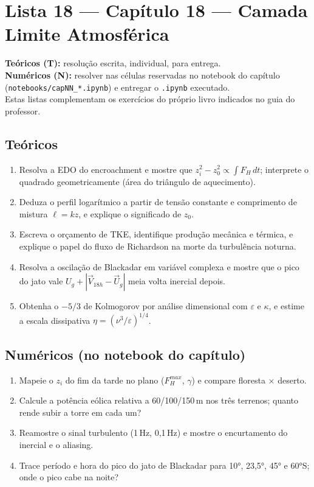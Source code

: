 \documentclass[11pt]{article}
\newcommand{\instrucoes}{%
\begin{caixalista}
\textbf{Teóricos (T):} resolução escrita, individual, para entrega.\\
\textbf{Numéricos (N):} resolver nas células reservadas no notebook do
capítulo (\texttt{notebooks/capNN\_*.ipynb}) e entregar o
\texttt{.ipynb} executado.\\
Estas listas complementam os exercícios do próprio livro indicados no
guia do professor.
\end{caixalista}}
\begin{document}
\clearpage
\section*{Lista 18 --- Capítulo 18 --- Camada Limite Atmosférica}
\instrucoes

\subsection*{Teóricos}

\begin{enumerate}[label=\textbf{T\arabic*.},itemsep=4pt]
  \item Resolva a EDO do encroachment e mostre que
        $z_i^2 - z_0^2 \propto \int F_H\,dt$; interprete o quadrado
        geometricamente (área do triângulo de aquecimento).
  \item Deduza o perfil logarítmico a partir de tensão constante e
        comprimento de mistura $\ell = kz$, e explique o significado
        de $z_0$.
  \item Escreva o orçamento de TKE, identifique produção mecânica e
        térmica, e explique o papel do fluxo de Richardson na morte da
        turbulência noturna.
  \item Resolva a oscilação de Blackadar em variável complexa e mostre
        que o pico do jato vale $U_g + |{\vec V}_{18h} - \vec U_g|$
        meia volta inercial depois.
  \item Obtenha o $-5/3$ de Kolmogorov por análise dimensional com
        $\varepsilon$ e $\kappa$, e estime a escala dissipativa
        $\eta = (\nu^3/\varepsilon)^{1/4}$.
\end{enumerate}

\subsection*{Numéricos (no notebook do capítulo)}

\begin{enumerate}[label=\textbf{N\arabic*.},itemsep=4pt]
  \item Mapeie o $z_i$ do fim da tarde no plano
        ($F_H^{max}$, $\gamma$) e compare floresta × deserto.
  \item Calcule a potência eólica relativa a 60/100/150\,m nos três
        terrenos; quanto rende subir a torre em cada um?
  \item Reamostre o sinal turbulento (1\,Hz, 0{,}1\,Hz) e mostre o
        encurtamento do inercial e o aliasing.
  \item Trace período e hora do pico do jato de Blackadar para 10°,
        23{,}5°, 45° e 60°S; onde o pico cabe na noite?
\end{enumerate}
\end{document}
